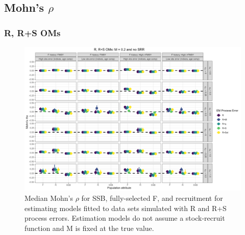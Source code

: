 \documentclass[
  12pt,
]{article}
\begin{document}
\hypertarget{mohns-rho-1}{%
\subsection*{\texorpdfstring{Mohn's
\(\rho\)}{Mohn's \textbackslash rho}}\label{mohns-rho-1}}

\hypertarget{r-rs-oms-1}{%
\subsubsection*{R, R+S OMs}\label{r-rs-oms-1}}

\begin{landscape}
\begin{figure}
\caption{Median Mohn's $\rho$ for SSB, fully-selected F, and recruitment for estimating models fitted to data sets simulated with R and R+S process errors.  Estimation models do not assume a stock-recruit function and M is fixed at the true value.}\label{naa_om_em_R_MF_mohns_rho}
\begin{center}
\includegraphics[width = \textwidth]{naa_om_mohns_rho_R_MF.png}
\end{center}
\end{figure}
\end{landscape}
\end{document}
